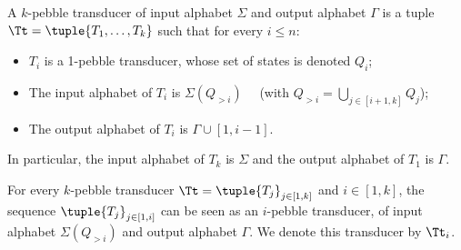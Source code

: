 \begin{comment}
\begin{definition}%
A $k$-pebble transducer of input alphabet $\Sigma$ and output alphabet $\Gamma$ is a tuple $\Tt=(T_k,\dots,T_{1})$ such that for every $i\leq n$:
\begin{itemize}
\item  $T_i$ is 1-pebble transducer, whose set of states is $Q_i$;
\item  The input alphabet of $T_i$ is $\Sigma_{[i+1,k]}$;
\item  The output alphabet of $T_i$ is $\Gamma\cup\bigcup_{1\leq j <i } Q_j$.
\end{itemize} 
In particular, the input alphabet of $T_k$ is $\Sigma$ and the output alphabet of $T_1$ is $\Gamma$. We denote by $\Tt_i$ the transducer $T_i$. 
\end{definition}
\end{comment}

\begin{definition}%
  A $k$-pebble transducer of input alphabet $\Sigma$ and output alphabet $\Gamma$ is a tuple $\Tt=\tuple{T_1,\dots,T_{k}}$ such that for every $i\leq n$:
  \begin{itemize}
  \item  $T_i$ is a 1-pebble transducer, whose set of states is denoted $Q_i$;
  \item  The input alphabet of $T_i$ is $\Sigma(Q_{>i})\quad$ (with $Q_{>i}=\bigcup_{j\in [i+1,k]}Q_j$);
  \item  The output alphabet of $T_i$ is $\Gamma \cup [1,i-1]$.
  \end{itemize} 
  In particular, the input alphabet of $T_k$ is $\Sigma$ and the output alphabet of $T_1$ is $\Gamma$.%
  \end{definition}


For every $k$-pebble transducer $\Tt=\tuple{T_j}_{j\in[1,k]}$ and $i\in[1,k]$,  the sequence $\tuple{T_j}_{j\in[1,i]}$ can be seen as an $i$-pebble transducer, of input alphabet $\Sigma(Q_{>i})$ and output alphabet $\Gamma$. We denote this transducer by $\Tt_i$.
 
